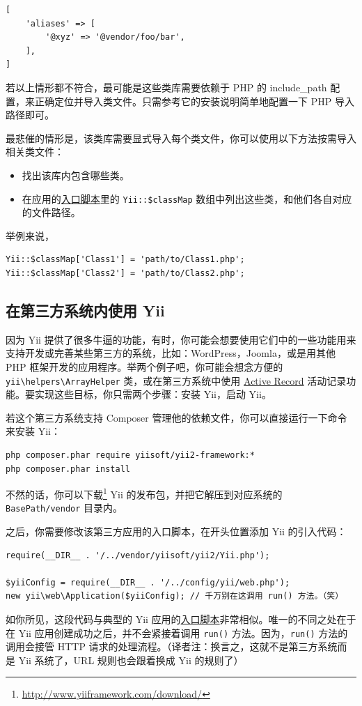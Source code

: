 \lstset{language=php}\begin{lstlisting}
[
    'aliases' => [
        '@xyz' => '@vendor/foo/bar',
    ],
]
\end{lstlisting}
若以上情形都不符合，最可能是这些类库需要依赖于 PHP 的 include\_path 配置，来正确定位并导入类文件。只需参考它的安装说明简单地配置一下 PHP 导入路径即可。

最悲催的情形是，该类库需要显式导入每个类文件，你可以使用以下方法按需导入相关类文件：

\begin{itemize}
\item 找出该库内包含哪些类。
\item 在应用的\hyperref[structure-entry-scripts.md]{入口脚本}里的 \lstinline|Yii::$classMap| 数组中列出这些类，和他们各自对应的文件路径。
\end{itemize}
举例来说，

\lstset{language=php}\begin{lstlisting}
Yii::$classMap['Class1'] = 'path/to/Class1.php';
Yii::$classMap['Class2'] = 'path/to/Class2.php';
\end{lstlisting}
\subsection{在第三方系统内使用 Yii \label{tutorial-yii-integration.md::using-yii-in-others}}
因为 Yii 提供了很多牛逼的功能，有时，你可能会想要使用它们中的一些功能用来支持开发或完善某些第三方的系统，比如：WordPress，Joomla，或是用其他 PHP 框架开发的应用程序。举两个例子吧，你可能会想念方便的 \texttt{yii{\allowbreak{}\textbackslash}helpers{\allowbreak{}\textbackslash}ArrayHelper} 类，或在第三方系统中使用
\hyperref[db-active-record.md]{Active Record} 活动记录功能。要实现这些目标，你只需两个步骤：安装 Yii，启动 Yii。

若这个第三方系统支持 Composer 管理他的依赖文件，你可以直接运行一下命令来安装 Yii：

\begin{lstlisting}
php composer.phar require yiisoft/yii2-framework:*
php composer.phar install
\end{lstlisting}
不然的话，你可以下载\footnote{\url{http://www.yiiframework.com/download/}} Yii 的发布包，并把它解压到对应系统的 \lstinline|BasePath/vendor| 目录内。

之后，你需要修改该第三方应用的入口脚本，在开头位置添加 Yii 的引入代码：

\lstset{language=php}\begin{lstlisting}
require(__DIR__ . '/../vendor/yiisoft/yii2/Yii.php');

$yiiConfig = require(__DIR__ . '/../config/yii/web.php');
new yii\web\Application($yiiConfig); // 千万别在这调用 run() 方法。（笑）
\end{lstlisting}
如你所见，这段代码与典型的 Yii 应用的\hyperref[structure-entry-scripts.md]{入口脚本}非常相似。唯一的不同之处在于在 Yii 应用创建成功之后，并不会紧接着调用 \lstinline|run()| 方法。因为，\lstinline|run()| 方法的调用会接管 HTTP 请求的处理流程。（译者注：换言之，这就不是第三方系统而是 Yii 系统了，URL 规则也会跟着换成 Yii 的规则了）

